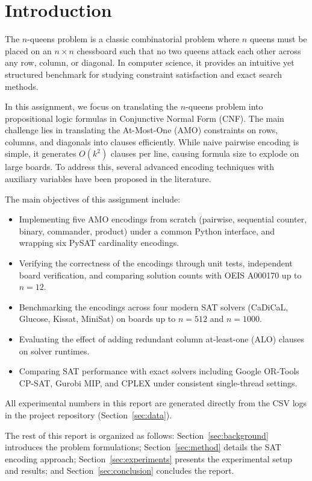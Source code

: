 \documentclass[a4paper,fleqn]{cas-sc}
\begin{document}
\section{Introduction}\label{sec:intro}

The $n$-queens problem is a classic combinatorial problem where $n$ queens must be placed on an $n\times n$ chessboard such that no two queens attack each other across any row, column, or diagonal. In computer science, it provides an intuitive yet structured benchmark for studying constraint satisfaction and exact search methods.

In this assignment, we focus on translating the $n$-queens problem into propositional logic formulas in Conjunctive Normal Form (CNF). The main challenge lies in translating the At-Most-One (AMO) constraints on rows, columns, and diagonals into clauses efficiently. While naive pairwise encoding is simple, it generates $O(k^2)$ clauses per line, causing formula size to explode on large boards. To address this, several advanced encoding techniques with auxiliary variables have been proposed in the literature.

The main objectives of this assignment include:
\begin{itemize}
\item Implementing five AMO encodings from scratch (pairwise, sequential counter, binary, commander, product) under a common Python interface, and wrapping six PySAT cardinality encodings.
\item Verifying the correctness of the encodings through unit tests, independent board verification, and comparing solution counts with OEIS A000170 up to $n=12$.
\item Benchmarking the encodings across four modern SAT solvers (CaDiCaL, Glucose, Kissat, MiniSat) on boards up to $n=512$ and $n=1000$.
\item Evaluating the effect of adding redundant column at-least-one (ALO) clauses on solver runtimes.
\item Comparing SAT performance with exact solvers including Google OR-Tools CP-SAT, Gurobi MIP, and CPLEX under consistent single-thread settings.
\end{itemize}
All experimental numbers in this report are generated directly from the CSV logs in the project repository (Section~\ref{sec:data}).

The rest of this report is organized as follows: Section~\ref{sec:background} introduces the problem formulations; Section~\ref{sec:method} details the SAT encoding approach; Section~\ref{sec:experiments} presents the experimental setup and results; and Section~\ref{sec:conclusion} concludes the report.
\end{document}
